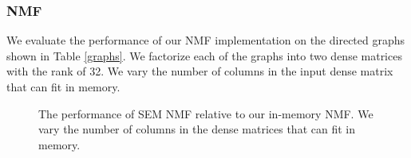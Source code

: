\subsubsection{NMF}
We evaluate the performance of our NMF implementation on the directed graphs
shown in Table \ref{graphs}. We factorize each of the graphs into two dense
matrices with the rank of 32. We vary the number of columns in the input dense
matrix that can fit in memory.

\begin{figure}
	\begin{center}
		\footnotesize
		
		\caption{The performance of SEM NMF relative to our in-memory NMF.
			We vary the number of columns in the dense matrices that can fit
		in memory.}
		\label{perf:NMF}
	\end{center}
\end{figure}
